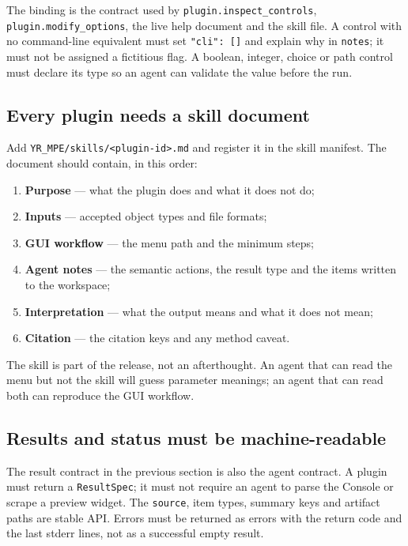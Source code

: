\documentclass[10pt]{report}
\begin{document}
The binding is the contract used by \texttt{plugin.inspect\_controls},
\texttt{plugin.modify\_options}, the live help document and the skill file. A
control with no command-line equivalent must set \texttt{"cli": []} and explain
why in \texttt{notes}; it must not be assigned a fictitious flag. A boolean,
integer, choice or path control must declare its type so an agent can validate
the value before the run.

\subsection{Every plugin needs a skill document}

Add \texttt{YR\_MPE/skills/<plugin-id>.md} and register it in the skill
manifest. The document should contain, in this order:

\begin{enumerate}
  \item \textbf{Purpose} --- what the plugin does and what it does not do;
  \item \textbf{Inputs} --- accepted object types and file formats;
  \item \textbf{GUI workflow} --- the menu path and the minimum steps;
  \item \textbf{Agent notes} --- the semantic actions, the result type and the
        items written to the workspace;
  \item \textbf{Interpretation} --- what the output means and what it does not
        mean;
  \item \textbf{Citation} --- the citation keys and any method caveat.
\end{enumerate}

The skill is part of the release, not an afterthought. An agent that can read
the menu but not the skill will guess parameter meanings; an agent that can
read both can reproduce the GUI workflow.

\subsection{Results and status must be machine-readable}

The result contract in the previous section is also the agent contract. A
plugin must return a \texttt{ResultSpec}; it must not require an agent to parse
the Console or scrape a preview widget. The \texttt{source}, item types,
summary keys and artifact paths are stable API. Errors must be returned as
errors with the return code and the last stderr lines, not as a successful
empty result.
\end{document}
